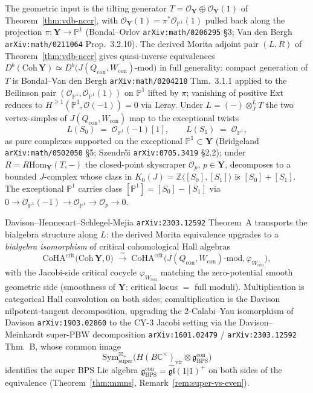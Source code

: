 \documentclass[11pt]{amsart}
\theoremstyle{definition}
\providecommand{\bY}{\mathbf{Y}}
\providecommand{\cO}{\mathcal{O}}
\providecommand{\Hom}{\mathrm{Hom}}
\providecommand{\Ext}{\mathrm{Ext}}
\providecommand{\bZ}{\mathbb{Z}}
\providecommand{\bC}{\mathbb{C}}
\providecommand{\bP}{\mathbb{P}}
\providecommand{\fgl}{\mathfrak{gl}}
\providecommand{\fg}{\mathfrak{g}}
\begin{document}
The geometric input is the tilting generator $T = \cO_\bY \oplus
\cO_\bY(1)$ of Theorem~\ref{thm:vdb-nccr}, with $\cO_\bY(1) =
\pi^* \cO_{\bP^1}(1)$ pulled back along the projection $\pi: \bY \to
\bP^1$ (Bondal--Orlov \texttt{arXiv:math/0206295} \S3; Van den Bergh
\texttt{arXiv:math/0211064} Prop.~3.2.10). The derived Morita adjoint
pair $(L, R)$ of Theorem~\ref{thm:vdb-nccr} gives quasi-inverse
equivalences $D^b(\mathrm{Coh}\,\bY) \simeq D^b\bigl(J(Q_{\mathrm{con}},
W_{\mathrm{con}})\text{-mod}\bigr)$ in full generality: compact
generation of $T$ is Bondal--Van den Bergh \texttt{arXiv:math/0204218}
Thm.~3.1.1 applied to the Beilinson pair $(\cO_{\bP^1},
\cO_{\bP^1}(1))$ on $\bP^1$ lifted by $\pi$; vanishing of positive
$\Ext$ reduces to $H^{\geq 1}(\bP^1, \cO(-1)) = 0$ via Leray. Under
$L = (-) \otimes^L_{J} T$ the two vertex-simples of $J(Q_{\mathrm{con}},
W_{\mathrm{con}})$ map to the exceptional twists
\[
  L(S_0) \;=\; \cO_{\bP^1}(-1)[1],
  \qquad
  L(S_1) \;=\; \cO_{\bP^1},
\]
as pure complexes supported on the exceptional $\bP^1 \subset \bY$
(Bridgeland \texttt{arXiv:math/0502050} \S5; Szendr\H{o}i
\texttt{arXiv:0705.3419} \S2.2); under $R = R\Hom_\bY(T, -)$ the
closed-point skyscraper $\cO_p$, $p \in \bY$, decomposes to a bounded
$J$-complex whose class in $K_0(J) = \bZ\langle[S_0],[S_1]\rangle$ is
$[S_0] + [S_1]$. The exceptional $\bP^1$ carries class $[\bP^1] =
[S_0] - [S_1]$ via $0 \to \cO_{\bP^1}(-1) \to \cO_{\bP^1} \to \cO_p
\to 0$.

Davison--Hennecart--Schlegel-Mejia \texttt{arXiv:2303.12592} Theorem~A
transports the bialgebra structure along $L$: the derived Morita
equivalence upgrades to a \emph{bialgebra isomorphism} of critical
cohomological Hall algebras
\[
  \mathrm{CoHA}^{\mathrm{crit}}\bigl(\mathrm{Coh}\,\bY, 0\bigr)
  \;\xrightarrow{\;\sim\;}\;
  \mathrm{CoHA}^{\mathrm{crit}}\bigl(J(Q_{\mathrm{con}},
  W_{\mathrm{con}})\text{-mod}, \varphi_{W_{\mathrm{con}}}\bigr),
\]
with the Jacobi-side critical cocycle $\varphi_{W_{\mathrm{con}}}$
matching the zero-potential smooth geometric side (smoothness of $\bY$:
critical locus $=$ full moduli). Multiplication is categorical Hall
convolution on both sides; comultiplication is the Davison
nilpotent-tangent decomposition, upgrading the 2-Calabi--Yau
isomorphism of Davison \texttt{arXiv:1903.02860} to the CY-$3$ Jacobi
setting via the Davison--Meinhardt super-PBW decomposition
\texttt{arXiv:1601.02479} / \texttt{arXiv:2303.12592} Thm.~B, whose
common image
\[
  \mathrm{Sym}^{\boxtimes_+}_{\mathrm{super}}
  \bigl(H(B\bC^\times)_{\mathrm{vir}} \otimes
  \fg_{\mathrm{BPS}}^{\mathrm{con}}\bigr)
\]
identifies the super BPS Lie algebra $\fg_{\mathrm{BPS}}^{\mathrm{con}}
= \widehat{\fgl}(1|1)^+$ on both sides of the equivalence
(Theorem~\ref{thm:mmns}, Remark~\ref{rem:super-vs-even}).
\end{document}
